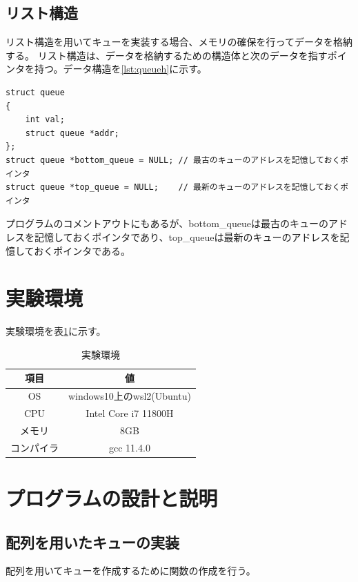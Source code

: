 \documentclass[dvipdfmx]{jsarticle}
\begin{document}
\subsection{リスト構造}
リスト構造を用いてキューを実装する場合、メモリの確保を行ってデータを格納する。
リスト構造は、データを格納するための構造体と次のデータを指すポインタを持つ。データ構造を\ref{lst:queueh}に示す。
\begin{lstlisting}[caption={queue.h}, label={lst:queueh}]
struct queue
{
    int val;
    struct queue *addr;
};
struct queue *bottom_queue = NULL; // 最古のキューのアドレスを記憶しておくポインタ
struct queue *top_queue = NULL;    // 最新のキューのアドレスを記憶しておくポインタ
\end{lstlisting}
プログラムのコメントアウトにもあるが、bottom\_queueは最古のキューのアドレスを記憶しておくポインタであり、top\_queueは最新のキューのアドレスを記憶しておくポインタである。
\section{実験環境}
実験環境を表\ref{tab:environment}に示す。
\begin{table}[ht]
  \centering
  \begin{tabular}{|c|c|}
    \hline
    \textbf{項目} & \textbf{値}              \\
    \hline
    OS          & windows10上のwsl2(Ubuntu) \\
    \hline
    CPU         & Intel Core i7 11800H          \\
    \hline
    メモリ         & 8GB                     \\
    \hline
    コンパイラ       & gcc 11.4.0              \\
    \hline
  \end{tabular}
  \caption{実験環境}
  \label{tab:environment}
\end{table}
\section{プログラムの設計と説明}
\subsection{配列を用いたキューの実装}
配列を用いてキューを作成するために関数の作成を行う。
\end{document}

